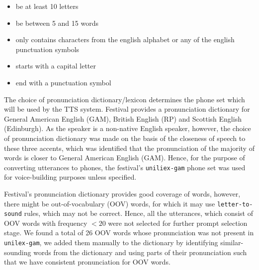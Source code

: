 \documentclass[lettersize,journal]{IEEEtran}
\begin{document}
\begin{itemize}
    \item be at least 10 letters 
    \item be between 5 and 15 words 
    \item only contains characters from the english alphabet or any of the english punctuation symbols
    \item starts with a capital letter
    \item end with a punctuation symbol
\end{itemize}



 The choice of pronunciation dictionary/lexicon determines the phone set which will be used by the TTS system. Festival provides a pronunciation dictionary for General American English (GAM), British English (RP) and Scottish English (Edinburgh). As the speaker is a non-native English speaker, however, the choice of pronunciation dictionary was made on the basis of the closeness of speech to these three accents, which was identified that the pronunciation of the majority of words is closer to General American English (GAM). Hence, for the purpose of converting utterances to phones, the festival's \verb|uniliex-gam| phone set was used for voice-building purposes unless specified.

Festival's pronunciation dictionary provides good coverage of words, however, there might be out-of-vocabulary (OOV) words, for which it may use \verb|letter-to-sound| rules, which may not be correct. Hence, all the utterances, which consist of OOV words with frequency $<20$ were not selected for further prompt selection stage. We found a total of 26 OOV words whose pronunciation was not present in \verb|unilex-gam|, we added them manually to the dictionary by identifying similar-sounding words from the dictionary and using parts of their pronunciation such that we have consistent pronunciation for OOV words.
\end{document}
